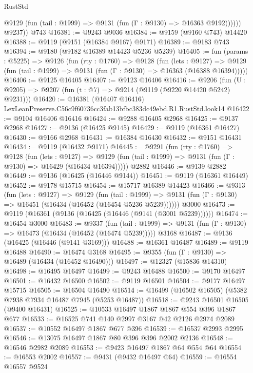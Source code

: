 \begin{lexlean}{RustStd}
\begin{coremodule}
              @9129 (fun (tail : @1999) => @9131 (fun (Γ : @9130) => @16363 @9192))))))
        @9237))
    @743
@16381 := @9243 @9036
@16384 := @9159 (@9160 @743) @14420
@16388 := @9119 (@9151 (@16384 @9167) @9171)
@16389 := @9183 @743
@16394 := @9180 (@9182 @16389 @14423 @5236 @5239)
@16405 := fun (params : @5225) =>
  @9126
    (fun (rty : @1760) =>
    @9128
      (fun (lets : @9127) =>
      @9129 (fun (tail : @1999) => @9131 (fun (Γ : @9130) => @16363 (@16388 @16394)))))
@16406 := @9125 @16405
@16407 := @9123 @16406
@16416 := @9206
    (fun (U : @9205) => @9207 (fun (t : @7) => @9214 (@9119 (@9220 @14420 @5242) @9231)))
@16420 := @16381 (@16407 @16416) LexLeanPreserve.C56c9f60736cc3fab13bfbc383dc49ebd.R1.RustStd.look14
@16422 := @9104 @16406 @16416
@16424 := @9288 @16405 @2968
@16425 := @9137 @2968
@16427 := @9136 (@16425 @9145)
@16429 := @9119 (@16361 @16427)
@16430 := @9166 @2968
@16431 := @16384 @16430
@16432 := @9151 @16431
@16434 := @9119 (@16432 @9171)
@16445 := @9291
    (fun (rty : @1760) =>
    @9128
      (fun (lets : @9127) =>
      @9129 (fun (tail : @1999) => @9131 (fun (Γ : @9130) => @16429 (@16434 @16394)))))
    @2882
@16446 := @9139 @2882
@16449 := @9136 (@16425 (@16446 @9144))
@16451 := @9119 (@16361 @16449)
@16452 := @9178 @15715
@16454 := @15717 @16389 @14423
@16466 := @9313
    (fun (lets : @9127) =>
    @9129
      (fun (tail : @1999) =>
      @9131 (fun (Γ : @9130) => @16451 (@16434 (@16452 (@16454 @5236 @5239))))))
    @3000
@16473 := @9119 (@16361 (@9136 (@16425 (@16446 (@9141 (@3001 @5239))))))
@16474 := @16454 @3000
@16483 := @9337
    (fun (tail : @1999) => @9131 (fun (Γ : @9130) => @16473 (@16434 (@16452 (@16474 @5239)))))
    @3168
@16487 := @9136 (@16425 (@16446 (@9141 @3169)))
@16488 := @16361 @16487
@16489 := @9119 @16488
@16490 := @16474 @3168
@16495 := @9355 (fun (Γ : @9130) => @16489 (@16434 (@16452 @16490)))
@16497 := @12327 (@15836 @14310)
@16498 := @16495 @16497
@16499 := @9243 @16488
@16500 := @9170 @16497
@16501 := @16432 @16500
@16502 := @9119 @16501
@16504 := @9177 @16497 @15715
@16505 := @16504 @16490
@16514 := @16499 (@16502 @16505) (@5382 @7938 @7934 @16487 @7945 (@5253 @16487))
@16518 := @9243 @16501 @16505 (@9400 @16431)
@16525 := @10533 @16497 @1867 @1867 @554 @396 @1867 @677
@16533 := @16525 @741 @140 @2997 @3167 @42 @2126 @2974 @2089
@16537 := @10552 @16497 @1867 @677 @396
@16539 := @16537 @2993 @2995
@16546 := @13075 @16497 @1867 @80 @396 @396 @2002 @2136
@16548 := @16546 @2982 @2089
@16553 := @9423 @16497 @1867 @64 @554 @64
@16554 := @16553 @2002
@16557 := @9431 (@9432 @16497 @64)
@16559 := @16554 @16557 @9524

\end{coremodule}
\end{lexlean}
